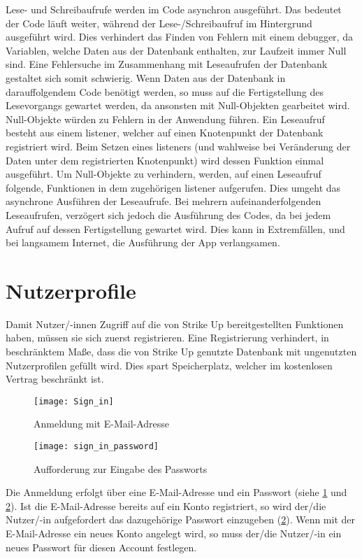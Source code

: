 Lese- und Schreibaufrufe werden im Code asynchron ausgeführt. Das bedeutet der Code \glqq{}läuft\grqq{} weiter, während der Lese-/Schreibaufruf im Hintergrund ausgeführt wird. Dies
verhindert das Finden von Fehlern mit einem \gls{debugger}, da Variablen, welche Daten aus der Datenbank enthalten, zur Laufzeit immer Null sind. Eine Fehlersuche im Zusammenhang mit
Leseaufrufen der Datenbank gestaltet sich somit schwierig. \newline
Wenn Daten aus der Datenbank in darauffolgendem Code benötigt werden, so muss auf die Fertigstellung des Lesevorgangs gewartet werden, da ansonsten mit Null-Objekten gearbeitet wird. Null-Objekte
würden zu Fehlern in der Anwendung führen. \newline
Ein Leseaufruf besteht aus einem \gls{listener}, welcher auf einen Knotenpunkt der Datenbank registriert wird. Beim Setzen eines \gls{listener}s (und wahlweise bei Veränderung der Daten
unter dem registrierten Knotenpunkt) wird dessen Funktion einmal ausgeführt. Um Null-Objekte zu verhindern, werden, auf einen Leseaufruf folgende, Funktionen in dem zugehörigen \gls{listener}
aufgerufen. Dies umgeht das asynchrone Ausführen der Leseaufrufe. Bei mehrern aufeinanderfolgenden Leseaufrufen, verzögert sich jedoch die Ausführung des Codes, da bei jedem Aufruf auf
dessen Fertigstellung gewartet wird. Dies kann in Extremfällen, und bei langsamem Internet, die Ausführung der App verlangsamen.


\section{Nutzerprofile}
\label{sec:profile}

Damit Nutzer/-innen Zugriff auf die von Strike Up bereitgestellten Funktionen haben, müssen sie sich zuerst registrieren. Eine Registrierung verhindert, in beschränktem Maße, dass die
von Strike Up genutzte Datenbank mit ungenutzten Nutzerprofilen gefüllt wird. Dies spart Speicherplatz, welcher im kostenlosen Vertrag beschränkt ist.
\begin{figure}[htpb]
    \centering
    \texttt{[image: Sign\_in]}
    \caption{Anmeldung mit E-Mail-Adresse}
    \label{img:signin_email}
\end{figure}
\begin{figure}[htpb]
    \centering
    \texttt{[image: sign\_in\_password]}
    \caption{Aufforderung zur Eingabe des Passworts}
    \label{img:signin_password}
\end{figure}
Die Anmeldung erfolgt über eine E-Mail-Adresse und ein Passwort (siehe \ref{img:signin_email} und \ref{img:signin_password}). Ist die E-Mail-Adresse bereits auf ein Konto registriert, so
wird der/die Nutzer/-in aufgefordert das dazugehörige Passwort einzugeben (\ref{img:signin_password}). Wenn mit der E-Mail-Adresse ein neues Konto angelegt wird, so muss der/die Nutzer/-in
ein neues Passwort für diesen Account festlegen.

